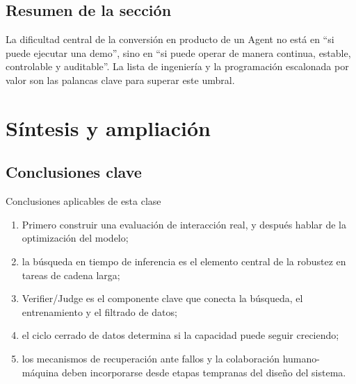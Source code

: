 \documentclass[a4paper]{article}
\begin{document}
\subsection{Resumen de la sección}
La dificultad central de la conversión en producto de un Agent no está en ``si puede ejecutar una demo'', sino en ``si puede operar de manera continua, estable, controlable y auditable''. La lista de ingeniería y la programación escalonada por valor son las palancas clave para superar este umbral.

\section{Síntesis y ampliación}

\subsection{Conclusiones clave}
\begin{importantbox}{Conclusiones aplicables de esta clase}
\begin{enumerate}
    \item Primero construir una evaluación de interacción real, y después hablar de la optimización del modelo;
    \item la búsqueda en tiempo de inferencia es el elemento central de la robustez en tareas de cadena larga;
    \item Verifier/Judge es el componente clave que conecta la búsqueda, el entrenamiento y el filtrado de datos;
    \item el ciclo cerrado de datos determina si la capacidad puede seguir creciendo;
    \item los mecanismos de recuperación ante fallos y la colaboración humano-máquina deben incorporarse desde etapas tempranas del diseño del sistema.
\end{enumerate}
\end{importantbox}
\end{document}
